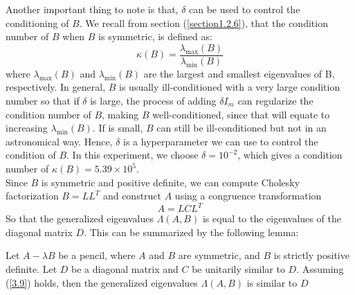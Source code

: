 \documentclass[12pt,gsu,online,openany,singleside,hidelinks]{gsudiss}
\newcommand{\rep}[2]{\replaced{#1}{#2}}
\begin{document}
Another important thing to note is that, $\delta$ can be used to control the conditioning of $B$. We recall from section (\ref{section1.2.6}), that the condition number of $B$ when $B$ is symmetric, is defined as:
\begin{equation}
	\kappa(B) = \frac{\lambda_{\max}(B)}{\lambda_{\min}(B)}
\end{equation}
where $\lambda_{\max}(B)$ and $\lambda_{\min}(B)$ are the largest and smallest eigenvalues of B, respectively.
In general, $B$ is usually ill-conditioned with a very large condition number so that if $\delta$ is large, the process of adding $\delta I_m$ can regularize the condition number of $B$, making $B$ well-conditioned, since that will equate to increasing $\lambda_{\min}(B)$. If \rep{$\delta$}{delta} is small, $B$ can still be ill-conditioned but not in an astronomical way. Hence, $\delta$ is a hyperparameter we can use to control the condition of $B$. In this experiment, we choose $\delta = 10^{-2}$, which gives a condition number of $\kappa(B) = 5.39 \times 10^5$.\\
Since $B$ is symmetric and positive definite, we can compute \rep{its}{it's} Cholesky factorization $B = LL^T$ and construct $A$ using a congruence transformation
\begin{equation}\label{3.9}
	A = LCL^T
\end{equation}
So that the generalized eigenvalues $\Lambda(A, B)$ is equal to the eigenvalues of the diagonal matrix $D$. This can be summarized by the following lemma:
\begin{lemma}
	Let $A-\lambda B$ be a pencil, where $A$ and $B$ are symmetric, and $B$ is strictly positive definite. Let $D$ be a diagonal matrix and $C$ be unitarily similar to $D$. Assuming (\ref{3.9}) holds, then the generalized eigenvalues $\Lambda(A, B)$ is similar to $D$
\end{lemma}
\end{document}
